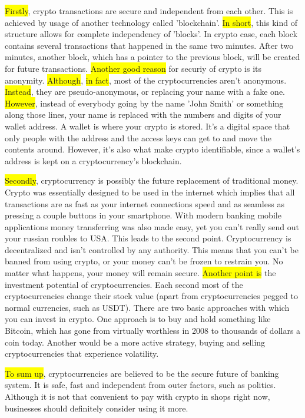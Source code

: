 \documentclass[a4paper,12pt]{article}
\newcommand{\linker}[1]{\colorbox{yellow}{#1}}
\begin{document}
    \linker{Firstly}, crypto transactions are secure and independent from each other. This is achieved by usage of
    another technology called 'blockchain'. \linker{In short}, this kind of structure allows for complete independency
    of 'blocks'. In crypto case, each block contains several transactions that happened in the same two minutes.
    After two minutes, another block, which has a pointer to the previous block, will be created for future transactions.
    \linker{Another good reason} for securiy of crypto is its anonymity. \linker{Although}, \linker{in fact}, most of the cryptocurrencies aren't
    anonymous. \linker{Instead}, they are pseudo-anonymous, or replacing your name with a fake one. \linker{However}, instead of everybody
    going by the name 'John Smith' or something along those lines, your name is replaced with the numbers and digits of
    your wallet address. A wallet is where your crypto is stored. It's a digital space that only people with the address and
    the access keys can get to and move the contents around. However, it's also what make crypto identifiable, since a wallet's
    address is kept on a cryptocurrency's blockchain.

    \linker{Secondly}, cryptocurrency is possibly the future replacement of traditional money. Crypto was essentially designed to be used
    in the internet which implies that all transactions are as fast as your internet connections speed and as seamless as pressing
    a couple buttons in your smartphone. With modern banking mobile applications money transferring was also made easy, yet you
    can't really send out your russian roubles to USA. This leads to the second point. Cryptocurrency is decentralized and isn't controlled
    by any authority. This means that you can't be banned from using crypto, or your money can't be frozen to restrain you.
    No matter what happens, your money will remain secure. \linker{Another point is} the investment potential of cryptocurrencies. Each second
    most of the cryptocurrencies change their stock value (apart from cryptocurrencies pegged to normal currencies, such as USDT). There are
    two basic approaches with which you can invest in crypto. One approach is to buy and hold something like Bitcoin, which has gone from
    virtually worthless in 2008 to thousands of dollars a coin today. Another would be a more active strategy, buying and selling
    cryptocurrencies that experience volatility.

    \linker{To sum up}, cryptocurrencies are believed to be the secure future of banking system. It is safe, fast and independent from
    outer factors, such as politics. Although it is not that convenient to pay with crypto in shops right now, businesses should
    definitely consider using it more.
\end{document}

